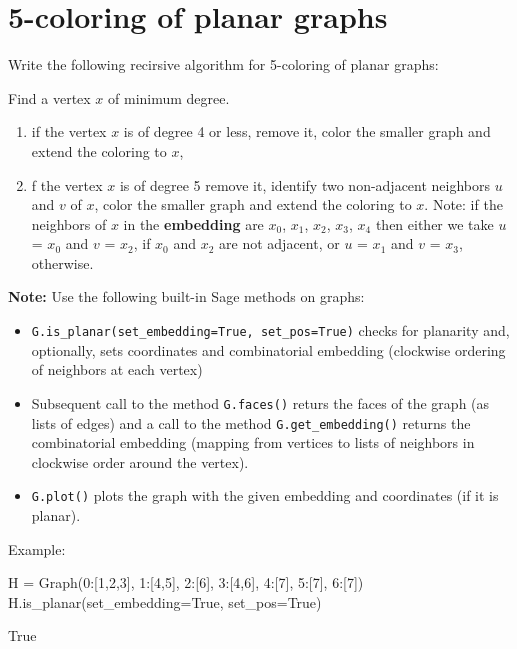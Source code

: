 \chapter{5-coloring of planar graphs}

Write the following recirsive algorithm for 5-coloring of planar graphs:

\medskip
\noindent Find a vertex $x$ of minimum degree.
\begin{enumerate}
    \item if the vertex $x$ is of degree 4 or less, remove it, color the smaller graph and extend the coloring to $x$,
    \item f the vertex $x$ is of degree 5 remove it, identify two non-adjacent neighbors $u$ and $v$ of $x$, color the smaller graph and extend the coloring to $x$. Note: if the neighbors of $x$ in the \textbf{embedding} are $x_0$, $x_1$, $x_2$, $x_3$, $x_4$ then either we take $u$ = $x_0$ and $v$ = $x_2$, if $x_0$ and $x_2$ are not adjacent, or $u$ = $x_1$ and $v$ = $x_3$, otherwise.
\end{enumerate}

\medskip
\noindent \textbf{Note:}
Use the following built-in Sage methods on graphs:
\begin{itemize}
\item \verb|G.is_planar(set_embedding=True, set_pos=True)| checks for planarity and, optionally, sets coordinates and combinatorial embedding (clockwise ordering of neighbors at each vertex)
\item  Subsequent call to the method \verb|G.faces()| returs the faces of the graph (as lists of edges) and a call to the method \verb|G.get_embedding()| returns the combinatorial embedding (mapping from vertices to lists of neighbors in clockwise order around the vertex).
\item  \verb|G.plot()| plots the graph with the given embedding and coordinates (if it is planar).
\end{itemize}

\medskip
Example:
\begin{sageCell}
    H = Graph({0:[1,2,3], 1:[4,5], 2:[6], 3:[4,6], 4:[7], 5:[7], 6:[7]})
    H.is_planar(set_embedding=True, set_pos=True)
\end{sageCell}
\begin{outCell}
    True
\end{outCell}


